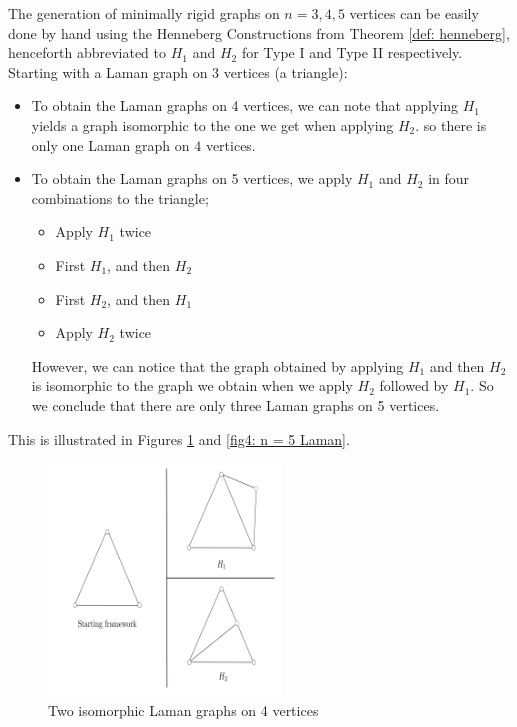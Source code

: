\begin{flushleft}
The generation of minimally rigid graphs on $n = 3,4,5$ vertices can be easily done by hand using the Henneberg Constructions from Theorem \ref{def: henneberg}, henceforth abbreviated to $H_1$ and $H_2$ for Type I and Type II respectively. Starting with a Laman graph on 3 vertices (a triangle):
\begin{itemize}
    \item To obtain the Laman graphs on 4 vertices, we can note that applying $H_1$ yields a graph isomorphic to the one we get when applying $H_2$. so there is only one Laman graph on $4$ vertices. 
    \item To obtain the Laman graphs on 5 vertices, we apply $H_1$ and $H_2$ in four combinations to the triangle;
    \vspace{-2mm}
    \begin{itemize}
        \item Apply $H_1$ twice
        \vspace{-2mm}
        \item First $H_1$, and then $H_2$
        \vspace{-2mm}
        \item First $H_2$, and then $H_1$
        \vspace{-2mm}
        \item Apply $H_2$ twice
    \end{itemize}
    \vspace{-2mm}
    However, we can notice that the graph obtained by applying $H_1$ and then $H_2$ is isomorphic to the graph we obtain when we apply $H_2$ followed by $H_1$. So we conclude that there are only three Laman graphs on 5 vertices.
\end{itemize}

\noindent
This is illustrated in Figures \ref{fig4: n = 4 Laman} and \ref{fig4: n = 5 Laman}.
\end{flushleft}
\vspace{-4mm}
\begin{figure}[htbp]
    \centering
    \includegraphics[width = 0.55\textwidth]{Chapter 4/3. n=4.png}
    \caption{Two isomorphic Laman graphs on 4 vertices}
    \label{fig4: n = 4 Laman}
\end{figure}

